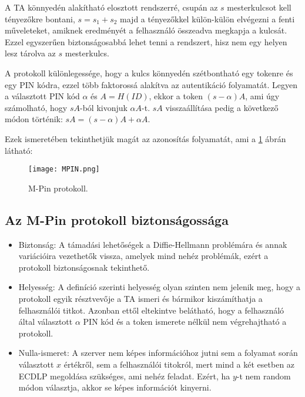 A TA könnyedén alakítható elosztott rendszerré, csupán az $s$ mesterkulcsot kell tényezőkre bontani, $s = s_1 + s_2$ majd a tényezőkkel külön-külön elvégezni a fenti műveleteket, amiknek eredményét a felhasználó összeadva megkapja a kulcsát. Ezzel egyszerűen biztonságosabbá lehet tenni a rendszert, hisz nem egy helyen lesz tárolva az $s$ mesterkulcs.

A protokoll különlegessége, hogy a kulcs könnyedén szétbontható egy tokenre és egy PIN kódra, ezzel több faktorossá alakítva az autentikáció folyamatát. Legyen a választott PIN kód $\alpha$ és $A = H(ID)$, ekkor a token $(s - \alpha)A$, ami úgy számolható, hogy $sA$-ból kivonjuk $\alpha A$-t. $sA$ visszaállítása pedig a következő módon történik: $sA = (s - \alpha)A + \alpha A$.

Ezek ismeretében tekinthetjük magát az azonosítás folyamatát, ami a \ref{Figure::MPIN} ábrán látható:

\begin{figure}[H]
    \centering
    \texttt{[image: MPIN.png]}
    \caption{M-Pin protokoll.}
    \label{Figure::MPIN}
\end{figure}

\subsection{Az M-Pin protokoll biztonságossága}

\begin{itemize}
    \item Biztonság: A támadási lehetőségek a Diffie-Hellmann problémára és annak variációira vezethetők vissza, amelyek mind nehéz problémák, ezért a protokoll biztonságosnak tekinthető.
    \item Helyesség: A definíció szerinti helyesség olyan szinten nem jelenik meg, hogy a protokoll egyik résztvevője a TA ismeri és bármikor kiszámíthatja a felhasználói titkot. Azonban ettől eltekintve belátható, hogy a felhasználó által választott $\alpha$ PIN kód és a token ismerete nélkül nem végrehajtható a protokoll.
    \item Nulla-ismeret: A szerver nem képes információhoz jutni sem a folyamat során választott $x$ értékről, sem a felhasználói titokról, mert mind a két esetben az ECDLP megoldása szükséges, ami nehéz feladat. Ezért, ha $y$-t nem random módon választja, akkor se képes információt kinyerni.
\end{itemize}